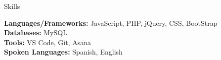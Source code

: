 \documentclass{resume} %
\begin{document}

\begin{rSection}{Skills}

\textbf{Languages/Frameworks:} JavaScript, PHP, jQuery, CSS, BootStrap  \\
\textbf{Databases:} MySQL  \\
\textbf{Tools:} VS Code, Git, Asana  \\
\textbf{Spoken Languages:} Spanish, English  \\

\end{rSection}

\end{document}
